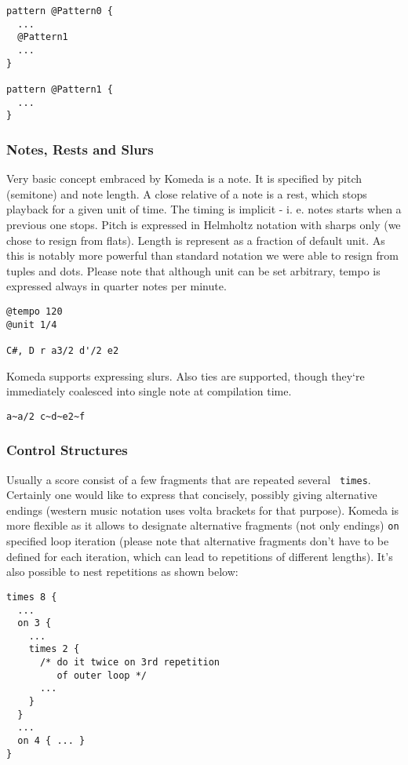 \documentclass{article}
\begin{document}
\begin{lstlisting}[caption=Example of pattern invocation]
pattern @Pattern0 {
  ...
  @Pattern1
  ... 
}

pattern @Pattern1 {
  ...
}
\end{lstlisting}

\subsubsection{Notes, Rests and Slurs}
Very basic concept embraced by Komeda is a note. It is specified by pitch
(semitone) and note length. A close relative of a note is a rest, which stops
playback for a given unit of time. The timing is implicit - i. e. notes starts
when a previous one stops. Pitch is expressed in Helmholtz notation with sharps
only (we chose to resign from flats). Length is represent as a fraction of
default unit. As this is notably more powerful than standard notation we were
able to resign from tuples and dots. Please note that although unit can be set
arbitrary, tempo is expressed always in quarter notes per minute.

\begin{lstlisting}[caption=Sample music score]
@tempo 120
@unit 1/4

C#, D r a3/2 d'/2 e2
\end{lstlisting}

Komeda supports expressing slurs. Also ties are supported, though they`re
immediately coalesced into single note at compilation time.

\begin{lstlisting}[caption=Expressing slurs]
a~a/2 c~d~e2~f
\end{lstlisting}

\subsubsection{Control Structures}
Usually a score consist of a few fragments that are repeated several {\tt
  times}. Certainly one would like to express that concisely, possibly giving
alternative endings (western music notation uses volta brackets for that
purpose). Komeda is more flexible as it allows to designate alternative
fragments (not only endings) {\tt on} specified loop iteration (please note
that alternative fragments don't have to be defined for each iteration, which
can lead to repetitions of different lengths). It's also possible to nest
repetitions as shown below:

\begin{lstlisting}[caption=Nested loops and alternatives]
times 8 {
  ...
  on 3 {
    ...
    times 2 {
      /* do it twice on 3rd repetition
         of outer loop */
      ...
    }
  }
  ... 
  on 4 { ... }
}
\end{lstlisting}
\end{document}
